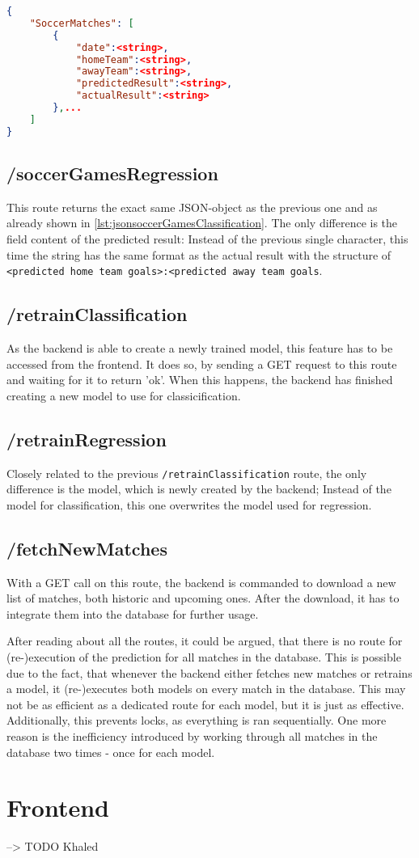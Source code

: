 \begin{lstlisting}[language=JSON,label={lst:jsonsoccerGamesClassification}, caption=JSON structure of API call on /soccerGamesClassification]
{
    "SoccerMatches": [
        {
            "date":<string>,
            "homeTeam":<string>,
            "awayTeam":<string>,
            "predictedResult":<string>,
            "actualResult":<string>
        },...
    ]
}
\end{lstlisting}

\subsection{/soccerGamesRegression}
This route returns the exact same JSON-object as the previous one and as already shown in \ref{lst:jsonsoccerGamesClassification}. The only difference is the field content of the predicted result: Instead of the previous single character, this time the string has the same format as the actual result with the structure of \lstinline[columns=fixed]{<predicted home team goals>:<predicted away team goals}.

\subsection{/retrainClassification}
As the backend is able to create a newly trained model, this feature has to be accessed from the frontend. It does so, by sending a GET request to this route and waiting for it to return 'ok'. When this happens, the backend has finished creating a new model to use for classicification.

\subsection{/retrainRegression}
Closely related to the previous \lstinline[columns=fixed]{/retrainClassification} route, the only difference is the model, which is newly created by the backend; Instead of the model for classification, this one overwrites the model used for regression.

\subsection{/fetchNewMatches}
With a GET call on this route, the backend is commanded to download a new list of matches, both historic and upcoming ones. After the download, it has to integrate them into the database for further usage.

After reading about all the routes, it could be argued, that there is no route for (re-)execution of the prediction for all matches in the database. This is possible due to the fact, that whenever the backend either fetches new matches or retrains a model, it (re-)executes both models on every match in the database. This may not be as efficient as a dedicated route for each model, but it is just as effective. Additionally, this prevents locks, as everything is ran sequentially. One more reason is the inefficiency introduced by working through all matches in the database two times - once for each model.

\section{Frontend}
--> TODO Khaled
